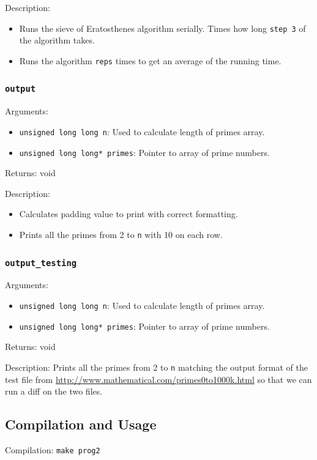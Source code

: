\documentclass{article}
\begin{document}
\medskip
\noindent
Description: 
\begin{itemize}
    \item Runs the sieve of Eratosthenes algorithm serially. Times how long \texttt{step 3} of the algorithm takes.

    \item Runs the algorithm \texttt{reps} times to get an average of the running time.
\end{itemize}

\subsubsection{\texttt{output}}
Arguments: 
    \begin{itemize}
	    \item \texttt{unsigned long long n}: Used to calculate length of primes array.
	    
	    \item \texttt{unsigned long long* primes}: Pointer to array of prime numbers.
    \end{itemize}
Returns: void

\medskip
\noindent
Description: 
\begin{itemize}
    \item Calculates padding value to print with correct formatting.

    \item Prints all the primes from 2 to \texttt{n} with 10 on each row.
\end{itemize}

\subsubsection{\texttt{output\_testing}}
Arguments: 
    \begin{itemize}
	    \item \texttt{unsigned long long n}: Used to calculate length of primes array.
	    
	    \item \texttt{unsigned long long* primes}: Pointer to array of prime numbers.
    \end{itemize}
Returns: void

\medskip
\noindent
Description: 
Prints all the primes from 2 to \texttt{n} matching the output format of the test file from \url{http://www.mathematical.com/primes0to1000k.html} so that we can run a diff on the two files.

\subsection{Compilation and Usage}
Compilation: \texttt{make prog2}
\end{document}

